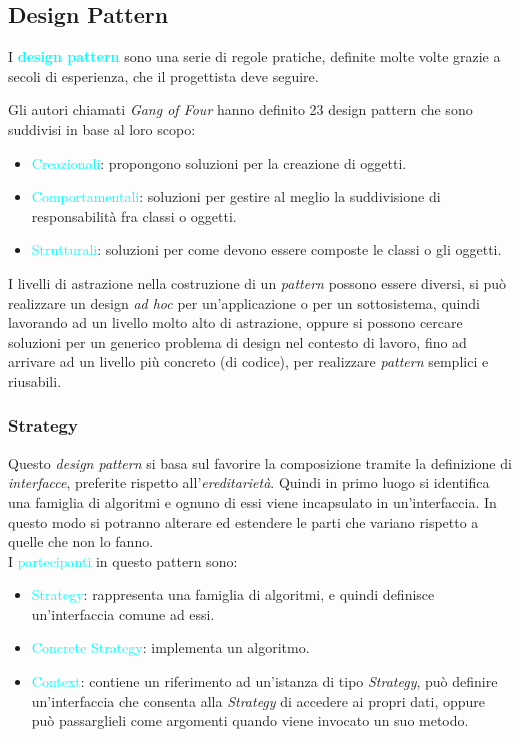 \subsection{Design Pattern}

I \textbf{\textcolor{cyan}{design pattern}} sono una serie di regole pratiche, 
definite molte volte grazie a secoli di esperienza, che il progettista deve seguire.

Gli autori chiamati \emph{Gang of Four} hanno definito 23 design pattern che sono suddivisi
in base al loro scopo:
\begin{itemize}
    \item \textcolor{cyan}{Creazionali}: propongono soluzioni per la creazione di oggetti.
    \item \textcolor{cyan}{Comportamentali}: soluzioni per gestire al meglio la suddivisione
        di responsabilità fra classi o oggetti.
    \item \textcolor{cyan}{Strutturali}: soluzioni per come devono essere composte le classi o gli oggetti.
\end{itemize}

I livelli di astrazione nella costruzione di un \emph{pattern} possono essere diversi, si può realizzare
un design \emph{ad hoc} per un'applicazione o per un sottosistema, quindi lavorando ad un livello molto alto di astrazione,
oppure si possono cercare soluzioni per un generico problema di design nel contesto di lavoro, fino ad arrivare ad un
livello più concreto (di codice), per realizzare \emph{pattern} semplici e riusabili.

\subsubsection{Strategy}

Questo \emph{design pattern} si basa sul favorire la composizione tramite la definizione
di \emph{interfacce}, preferite rispetto all'\emph{ereditarietà}. Quindi in primo luogo
si identifica una famiglia di algoritmi e ognuno di essi viene incapsulato in un'interfaccia.
In questo modo si potranno alterare ed estendere le parti che variano rispetto a quelle che non lo fanno. \\

I \textcolor{cyan}{partecipanti} in questo pattern sono:
\begin{itemize}
    \item \textcolor{cyan}{Strategy}: rappresenta una famiglia di algoritmi, e quindi definisce
        un'interfaccia comune ad essi.
    \item \textcolor{cyan}{Concrete Strategy}: implementa un algoritmo.
    \item \textcolor{cyan}{Context}: contiene un riferimento ad un'istanza di tipo \emph{Strategy}, può definire
        un'interfaccia che consenta alla \emph{Strategy} di accedere ai propri dati, oppure può passarglieli come argomenti
        quando viene invocato un suo metodo.
\end{itemize}

